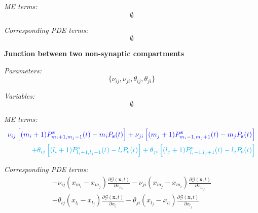 \documentclass[a4paper, 11pt]{article}
\begin{document}
              
              {\it ME terms:}
              \begin{equation}
                \emptyset
              \end{equation}
              
              {\it Corresponding PDE terms:}
              \begin{equation}
                \emptyset
              \end{equation}


              {\bf Junction between two non-synaptic compartments}
              
              {\it Parameters:}
              \begin{equation*}
                \{\nu_{ij}, \nu_{ji}, \theta_{ij}, \theta_{ji}\}
              \end{equation*}

              {\it Variables:}
              \begin{equation*}
                \emptyset
              \end{equation*}

              
              {\it ME terms:}
              \begin{equation}
                \begin{split}
                  \textcolor{blue}{\nu_{ij}\left[(m_i+1)P_{m_i+1, m_j-1}^{\mathbf s}(t) - m_iP_{\mathbf s}(t)\right] + \nu_{ji}\left[(m_j+1)P_{m_i-1, m_j+1}^{\mathbf s}(t) - m_jP_{\mathbf s}(t)\right]}\\
                  \textcolor{cyan}{+ \theta_{ij}\left[(l_i+1)P_{l_i+1, l_j-1}^{\mathbf s}(t) - l_iP_{\mathbf s}(t)\right] + \theta_{ji}\left[(l_j+1)P_{l_i-1, l_j+1}^{\mathbf s}(t) - l_jP_{\mathbf s}(t)\right]}
                \end{split}
              \end{equation}
              
              {\it Corresponding PDE terms:}
              \begin{equation}
                \begin{split}
                  -\nu_{ij}(x_{m_i}-x_{m_j})\frac{\partial\mathcal G(\mathbf x, t)}{\partial x_{m_i}} - \nu_{ji}(x_{m_j}-x_{m_i})\frac{\partial\mathcal G(\mathbf x, t)}{\partial x_{m_j}}\\
                  -\theta_{ij}(x_{l_i}-x_{l_j})\frac{\partial\mathcal G(\mathbf x, t)}{\partial x_{l_i}} - \theta_{ji}(x_{l_j}-x_{l_i})\frac{\partial\mathcal G(\mathbf x, t)}{\partial x_{l_j}}
                \end{split}
              \end{equation}
\end{document}

